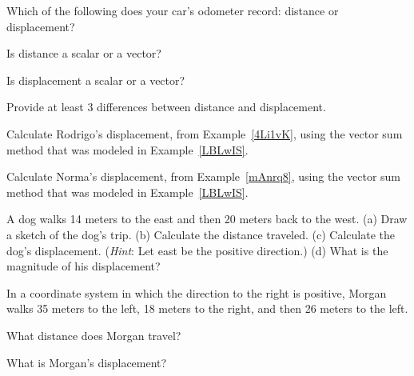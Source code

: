 \documentclass[main.tex]{subfiles}
\begin{document}
\begin{exercise}
    Which of the following does your car's odometer record: distance or displacement?
\end{exercise}

\begin{exercise}
    Is distance a scalar or a vector?
\end{exercise}

\begin{exercise}
    Is displacement a scalar or a vector?
\end{exercise}

\begin{exercise}
    Provide at least 3 differences between distance and displacement.
\end{exercise}

\begin{exercise}
    Calculate Rodrigo's displacement, from Example~\ref{4Li1vK}, using the vector sum method that was modeled in Example~\ref{LBLwIS}.
\end{exercise}

\begin{exercise}
    Calculate Norma's displacement, from Example~\ref{mAnrq8}, using the vector sum method that was modeled in Example~\ref{LBLwIS}.
\end{exercise}

\begin{exercise} \label{xs4oMq}
A dog walks 14 meters to the east and then 20 meters back to the west.  (a) Draw a sketch of the dog's trip. (b) Calculate the distance traveled. (c) Calculate the dog's displacement. (\textit{Hint}: Let east be the positive direction.) (d) What is the magnitude of his displacement?
\end{exercise}


\cyanhrule

\vspace{1em}

In a coordinate system in which the direction to the right is positive, Morgan walks 35 meters to the left, 18 meters to the right, and then 26 meters to the left.

\begin{exercise} \label{3rT1wE}
What distance does Morgan travel?
\end{exercise}

\begin{exercise} \label{0NkeX1}
What is Morgan's displacement?
\end{exercise}
\end{document}

